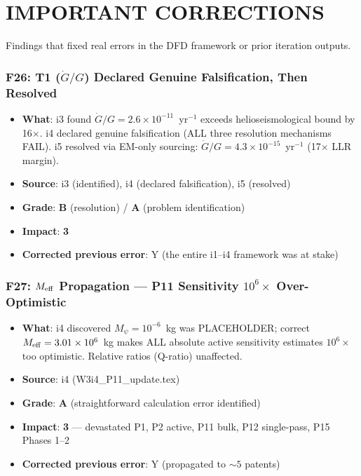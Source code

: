 \documentclass[11pt,a4paper]{article}
\newcommand{\grade}[1]{\textbf{#1}}
\newcommand{\impact}[1]{\textbf{#1}}
\begin{document}
\part{IMPORTANT CORRECTIONS}
\label{part:corrections}

Findings that fixed real errors in the DFD framework or prior iteration outputs.

\section{F26: T1 ($\dot{G}/G$) Declared Genuine Falsification, Then Resolved}
\begin{itemize}[nosep]
\item \textbf{What}: i3 found $\dot{G}/G = 2.6 \times 10^{-11}$~yr$^{-1}$ exceeds helioseismological bound by 16$\times$. i4 declared genuine falsification (ALL three resolution mechanisms FAIL). i5 resolved via EM-only sourcing: $\dot{G}/G = 4.3 \times 10^{-15}$~yr$^{-1}$ (17$\times$ LLR margin).
\item \textbf{Source}: i3 (identified), i4 (declared falsification), i5 (resolved)
\item \textbf{Grade}: \grade{B} (resolution) / \grade{A} (problem identification)
\item \textbf{Impact}: \impact{3}
\item \textbf{Corrected previous error}: Y (the entire i1--i4 framework was at stake)
\end{itemize}

\section{F27: $M_{\rm eff}$ Propagation --- P11 Sensitivity $10^6\times$ Over-Optimistic}
\begin{itemize}[nosep]
\item \textbf{What}: i4 discovered $M_\psi = 10^{-6}$~kg was PLACEHOLDER; correct $M_{\rm eff} = 3.01 \times 10^6$~kg makes ALL absolute active sensitivity estimates $10^6\times$ too optimistic. Relative ratios (Q-ratio) unaffected.
\item \textbf{Source}: i4 (W3i4\_P11\_update.tex)
\item \textbf{Grade}: \grade{A} (straightforward calculation error identified)
\item \textbf{Impact}: \impact{3} --- devastated P1, P2 active, P11 bulk, P12 single-pass, P15 Phases 1--2
\item \textbf{Corrected previous error}: Y (propagated to $\sim 5$ patents)
\end{itemize}
\end{document}
